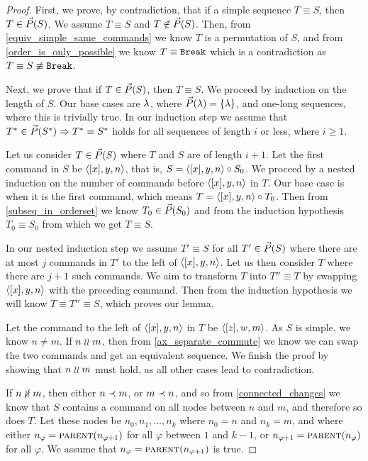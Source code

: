 \begin{proof}
First, we prove, by contradiction, that if a simple sequence $T\equiv S$, then $T\in\vec{P}({S})$.
We assume $T\equiv S$ and $T\not\in\vec{P}({S})$.
Then, from \cref{equiv_simple_same_commands} we know $T$ is a permutation of $S$,
and from \cref{order_is_only_possible} we know $T\equiv\mathtt{Break}$ which
is a contradiction as $T\equiv S\not\equiv\mathtt{Break}$.

Next, we prove that if $T\in\vec{P}({S})$, then $T\equiv S$.
We proceed by induction on the length of $S$.
Our base cases are $\lambda$, where $\vec{P}({\lambda})=\{\lambda\}$,
and one-long sequences, where this is trivially true.
In our induction step we assume that $T^*\in\vec{P}({S^*})\Rightarrow T^*\equiv S^*$ holds
for all sequences of length $i$ or less, where $i\geq 1$.

Let us consider $T\in\vec{P}({S})$ where $T$ and $S$ are of length $i+1$.
Let the first command in $S$ be $\langle{[x],y,n}\rangle$, that is, $S=\langle{[x],y,n}\rangle\circ S_0$.
We proceed by a nested induction on the number of commands before $\langle{[x],y,n}\rangle$ in $T$.
Our base case is when it is the first command, which means $T=\langle{[x],y,n}\rangle\circ T_0$.
Then from \cref{subseq_in_orderset} we know $T_0\in\vec{P}({S_0})$
and from the induction hypothesis $T_0\equiv S_0$ from which we get $T\equiv S$.

In our nested induction step we assume $T'\equiv S$ for all $T'\in\vec{P}({S})$
where there are at most $j$ commands in $T'$ to the left of $\langle{[x],y,n}\rangle$.
Let us then consider $T$ where there are $j+1$ such commands.
We aim to transform $T$ into $T''\equiv T$ by swapping $\langle{[x],y,n}\rangle$ with the preceding
command. Then from the induction hypothesis we will know $T\equiv T''\equiv S$,
which proves our lemma.

Let the command to the left of $\langle{[x],y,n}\rangle$ in $T$ be $\langle{[z],w,m}\rangle$.
As $S$ is simple, we know $n\neq m$.
If $n\mathrel{\wr\wr} m$, then from \cref{ax_separate_commute} we know we can swap the two commands
and get an equivalent sequence.
We finish the proof by showing that $n\mathrel{\wr\wr} m$ must hold, as
all other cases lead to contradiction.

\newcommand{\indx}{\varphi}
If $n\nunrel m$, then either $n\prec m$, or $m\prec n$, and so from
\cref{connected_changes} we know that $S$ contains a command on all nodes
between $n$ and $m$, and therefore so does $T$.
Let these nodes be $n_0, n_1, \ldots, n_k$ where $n_0=n$ and $n_k=m$,
and where 
either $n_\indx=\parentf{n_{\indx+1}}$ for all $\indx$ between $1$ and $k-1$,
or $n_{\indx+1}=\parentf{n_\indx}$ for all $\indx$.
We assume that $n_\indx=\parentf{n_{\indx+1}}$ is true.


\end{proof}
